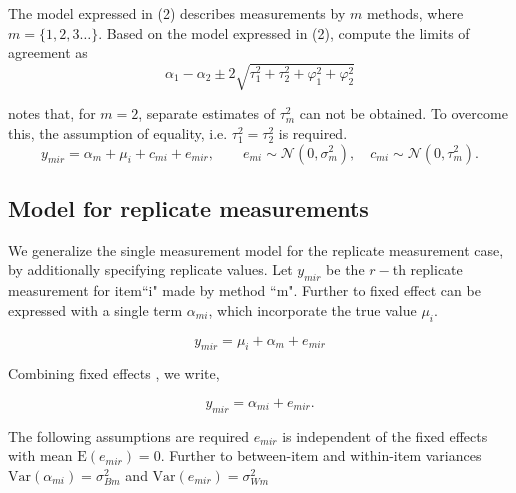 \documentclass[12pt, a4paper]{report}
\theoremstyle{plain}
\theoremstyle{definition}
\theoremstyle{remark}
\begin{document}
	The model expressed in (2) describes measurements by $m$ methods, where $m = \{1,2,3\ldots\}$. Based on the model expressed in (2), \citet{BXC2008} compute the limits of agreement as
	\[
	\alpha_1 - \alpha_2 \pm 2 \sqrt{ \tau^2_1 +  \tau^2_2 +  \varphi^2_1 +  \varphi^2_2 }
	\]
	
	\citet{BXC2008} notes that, for $m=2$, separate estimates of $\tau^2_m$ can not be obtained. To overcome this, the assumption of equality, i.e. $\tau^2_1 = \tau^2_2$ is required.
	\begin{equation}
	y_{mir}  = \alpha_{m} + \mu_{i} + c_{mi} + e_{mir}, \qquad  e_{mi}
	\sim \mathcal{N}(0,\sigma^{2}_{m}), \quad c_{mi} \sim \mathcal{N}(0,\tau^{2}_{m}).
	\end{equation}
	
	
	
	\subsection{Model for replicate measurements}

		
		
	We generalize the single measurement model for the replicate measurement case, by additionally specifying replicate values. Let $y_{mir}$ be the $r-$th replicate measurement for item``i" made by method ``m". Further to \citet{barnhart} fixed effect can be expressed with a single term $\alpha_{mi}$, which incorporate the true value $\mu_i$.
	
	\[ y_{mir} = \mu_{i} + \alpha_{m} + e_{mir}  \]
	
	Combining fixed effects \citep{barnhart}, we write,

	\[ y_{mir} = \alpha_{mi} + e_{mir}.\]
	
The following assumptions are required
 $e_{mir}$ is independent of the fixed effects with mean $\mbox{E}(e_{mir}) = 0$.
 Further to \citet{barnhart} between-item and within-item variances $\mbox{Var}(\alpha_{mi}) = \sigma^2_{Bm}$ and $\mbox{Var}(e_{mir}) = \sigma^2_{Wm}$		

	
	
	
	
\end{document}
